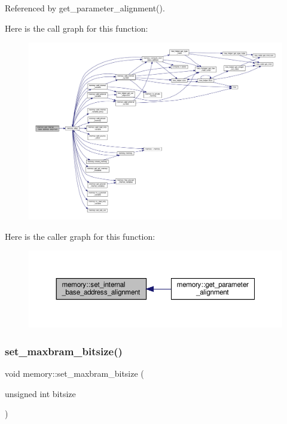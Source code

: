 Referenced by get\+\_\+parameter\+\_\+alignment().

Here is the call graph for this function\+:
\nopagebreak
\begin{figure}[H]
\begin{center}
\leavevmode
\includegraphics[width=350pt]{d8/d99/classmemory_a104f9ba5a915851cfefe36fd606dc178_cgraph}
\end{center}
\end{figure}
Here is the caller graph for this function\+:
\nopagebreak
\begin{figure}[H]
\begin{center}
\leavevmode
\includegraphics[width=350pt]{d8/d99/classmemory_a104f9ba5a915851cfefe36fd606dc178_icgraph}
\end{center}
\end{figure}
\mbox{\label{classmemory_a47b943a6e371ccdd0d4465be99b6c240}} 
\subsubsection{\texorpdfstring{set\+\_\+maxbram\+\_\+bitsize()}{set\_maxbram\_bitsize()}}
{\footnotesize\ttfamily void memory\+::set\+\_\+maxbram\+\_\+bitsize (\begin{DoxyParamCaption}\item[{unsigned int}]{bitsize }\end{DoxyParamCaption})\hspace{0.3cm}{\ttfamily [inline]}}



